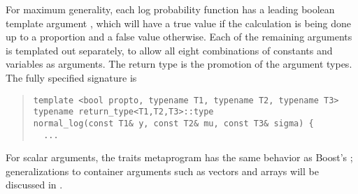 \documentclass[10pt]{article}
\begin{document}
For maximum generality, each log probability function has a leading
boolean template argument , which will have a true value
if the calculation is being done up to a proportion and a false value
otherwise.  Each of the remaining arguments is templated out
separately, to allow all eight combinations of constants and variables
as arguments.  The return type is the promotion of the argument
types.  The fully specified signature is
%
\begin{quote}
\begin{Verbatim}
template <bool propto, typename T1, typename T2, typename T3>
typename return_type<T1,T2,T3>::type
normal_log(const T1& y, const T2& mu, const T3& sigma) {
  ...
\end{Verbatim}
\end{quote}
%
For scalar arguments, the  traits metaprogram has
the same behavior as Boost's ; generalizations to
container arguments such as vectors and arrays will be discussed in
.
\end{document}
